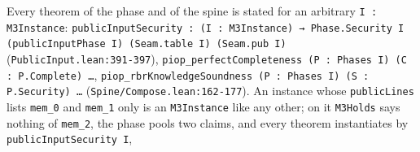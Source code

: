 Every theorem of the phase and of the spine is stated for an arbitrary \texttt{I : M3Instance}: \texttt{p\allowbreak{}u\allowbreak{}b\allowbreak{}l\allowbreak{}i\allowbreak{}c\allowbreak{}I\allowbreak{}n\allowbreak{}p\allowbreak{}u\allowbreak{}t\allowbreak{}S\allowbreak{}e\allowbreak{}c\allowbreak{}u\allowbreak{}r\allowbreak{}i\allowbreak{}t\allowbreak{}y\allowbreak{} :\allowbreak{} (\allowbreak{}I\allowbreak{} :\allowbreak{} M\allowbreak{}3\allowbreak{}I\allowbreak{}n\allowbreak{}s\allowbreak{}t\allowbreak{}a\allowbreak{}n\allowbreak{}c\allowbreak{}e\allowbreak{})\allowbreak{} →\allowbreak{} P\allowbreak{}h\allowbreak{}a\allowbreak{}s\allowbreak{}e\allowbreak{}.\allowbreak{}S\allowbreak{}e\allowbreak{}c\allowbreak{}u\allowbreak{}r\allowbreak{}i\allowbreak{}t\allowbreak{}y\allowbreak{} I\allowbreak{} (\allowbreak{}p\allowbreak{}u\allowbreak{}b\allowbreak{}l\allowbreak{}i\allowbreak{}c\allowbreak{}I\allowbreak{}n\allowbreak{}p\allowbreak{}u\allowbreak{}t\allowbreak{}P\allowbreak{}h\allowbreak{}a\allowbreak{}s\allowbreak{}e\allowbreak{} I\allowbreak{})\allowbreak{} (\allowbreak{}S\allowbreak{}e\allowbreak{}a\allowbreak{}m\allowbreak{}.\allowbreak{}t\allowbreak{}a\allowbreak{}b\allowbreak{}l\allowbreak{}e\allowbreak{} I\allowbreak{})\allowbreak{} (\allowbreak{}S\allowbreak{}e\allowbreak{}a\allowbreak{}m\allowbreak{}.\allowbreak{}p\allowbreak{}u\allowbreak{}b\allowbreak{} I\allowbreak{})} (\texttt{PublicInput.\allowbreak{}lean:391-{}397}), \texttt{p\allowbreak{}i\allowbreak{}o\allowbreak{}p\allowbreak{}\_\allowbreak{}p\allowbreak{}e\allowbreak{}r\allowbreak{}f\allowbreak{}e\allowbreak{}c\allowbreak{}t\allowbreak{}C\allowbreak{}o\allowbreak{}m\allowbreak{}p\allowbreak{}l\allowbreak{}e\allowbreak{}t\allowbreak{}e\allowbreak{}n\allowbreak{}e\allowbreak{}s\allowbreak{}s\allowbreak{} (\allowbreak{}P\allowbreak{} :\allowbreak{} P\allowbreak{}h\allowbreak{}a\allowbreak{}s\allowbreak{}e\allowbreak{}s\allowbreak{} I\allowbreak{})\allowbreak{} (\allowbreak{}C\allowbreak{} :\allowbreak{} P\allowbreak{}.\allowbreak{}C\allowbreak{}o\allowbreak{}m\allowbreak{}p\allowbreak{}l\allowbreak{}e\allowbreak{}t\allowbreak{}e\allowbreak{})\allowbreak{} …}, \texttt{p\allowbreak{}i\allowbreak{}o\allowbreak{}p\allowbreak{}\_\allowbreak{}r\allowbreak{}b\allowbreak{}r\allowbreak{}K\allowbreak{}n\allowbreak{}o\allowbreak{}w\allowbreak{}l\allowbreak{}e\allowbreak{}d\allowbreak{}g\allowbreak{}e\allowbreak{}S\allowbreak{}o\allowbreak{}u\allowbreak{}n\allowbreak{}d\allowbreak{}n\allowbreak{}e\allowbreak{}s\allowbreak{}s\allowbreak{} (\allowbreak{}P\allowbreak{} :\allowbreak{} P\allowbreak{}h\allowbreak{}a\allowbreak{}s\allowbreak{}e\allowbreak{}s\allowbreak{} I\allowbreak{})\allowbreak{} (\allowbreak{}S\allowbreak{} :\allowbreak{} P\allowbreak{}.\allowbreak{}S\allowbreak{}e\allowbreak{}c\allowbreak{}u\allowbreak{}r\allowbreak{}i\allowbreak{}t\allowbreak{}y\allowbreak{})\allowbreak{} …} (\texttt{Spine/\allowbreak{}Compose.\allowbreak{}lean:162-{}177}). An instance whose \texttt{publicLines} lists \texttt{mem\_\allowbreak{}0} and \texttt{mem\_\allowbreak{}1} only is an \texttt{M3Instance} like any other; on it \texttt{M3Holds} says nothing of \texttt{mem\_\allowbreak{}2}, the phase pools two claims, and every theorem instantiates by \texttt{publicInputSecurity I\textquotesingle{}}, 